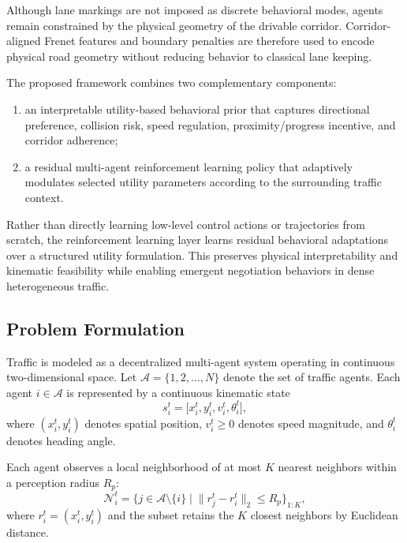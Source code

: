 \documentclass[conference]{IEEEtran}
\begin{document}
Although lane markings are not imposed as discrete behavioral modes, agents remain constrained by the physical geometry of the drivable corridor. Corridor-aligned Frenet features and boundary penalties are therefore used to encode physical road geometry without reducing behavior to classical lane keeping.

The proposed framework combines two complementary components:
\begin{enumerate}
    \item an interpretable utility-based behavioral prior that captures directional preference, collision risk, speed regulation, proximity/progress incentive, and corridor adherence;
    \item a residual multi-agent reinforcement learning policy that adaptively modulates selected utility parameters according to the surrounding traffic context.
\end{enumerate}

Rather than directly learning low-level control actions or trajectories from scratch, the reinforcement learning layer learns residual behavioral adaptations over a structured utility formulation. This preserves physical interpretability and kinematic feasibility while enabling emergent negotiation behaviors in dense heterogeneous traffic.

\subsection{Problem Formulation}
Traffic is modeled as a decentralized multi-agent system operating in continuous two-dimensional space. Let $\mathcal{A}=\{1,2,\ldots,N\}$ denote the set of traffic agents. Each agent $i\in\mathcal{A}$ is represented by a continuous kinematic state
\begin{equation}
s_{i}^{t}=\big[x_{i}^{t},y_{i}^{t},v_{i}^{t},\theta_{i}^{t}\big],
\end{equation}
where $(x_{i}^{t},y_{i}^{t})$ denotes spatial position, $v_{i}^{t}\ge 0$ denotes speed magnitude, and $\theta_{i}^{t}$ denotes heading angle.

Each agent observes a local neighborhood of at most $K$ nearest neighbors within a perception radius $R_{p}$:
\begin{equation}
\mathcal{N}_{i}^{t}
=
\Big\{
j\in\mathcal{A}\setminus\{i\}
\;\Big|\;
\|r_{j}^{t}-r_{i}^{t}\|_{2}\le R_{p}
\Big\}_{1:K},
\end{equation}
where $r_{i}^{t}=(x_{i}^{t},y_{i}^{t})$ and the subset retains the $K$ closest neighbors by Euclidean distance.
\end{document}
